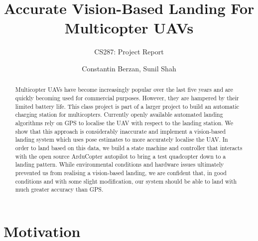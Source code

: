 \documentclass[10pt]{scrartcl} %
\title{Accurate Vision-Based Landing For Multicopter UAVs}
\subtitle{CS287: Project Report}
\author{Constantin Berzan, Sunil Shah}
\date{}
\begin{document}
\maketitle

\begin{abstract}
Multicopter UAVs have become increasingly popular over the last five years and are quickly becoming used for commercial purposes. However, they are hampered by their limited battery life. This class project is part of a larger project to build an automatic charging station for multicopters. Currently openly available automated landing algorithms rely on GPS to localise the UAV with respect to the landing station. We show that this approach is considerably inaccurate and implement a vision-based landing system which uses pose estimates to more accurately localise the UAV. 
In order to land based on this data, we build a state machine and controller that interacts with the open source ArduCopter autopilot to bring a test quadcopter down to a landing pattern. While environmental conditions and hardware issues ultimately prevented us from realising a vision-based landing, we are confident that, in good conditions and with some slight modification, our system should be able to land with much greater accuracy than GPS.
\end{abstract}
\section{Motivation}



% 


\end{document}
